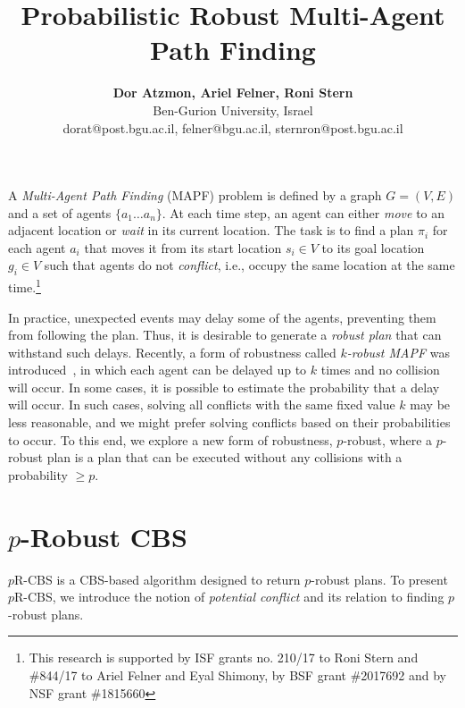 \documentclass[letterpaper]{article} %
\title{Probabilistic Robust Multi-Agent Path Finding}
\author{\Large \textbf{Dor Atzmon, Ariel Felner, Roni Stern}\\ %
Ben-Gurion University, Israel\\ %
dorat@post.bgu.ac.il, felner@bgu.ac.il, sternron@post.bgu.ac.il %
}
\newcommand{\prcbs}{$p$R-CBS\xspace}
\begin{document}
\maketitle


A {\em Multi-Agent Path Finding} (MAPF) problem is defined by a graph $G=(V,E)$ and a set of agents $\{a_1 \dots a_n\}$. At each time step, an agent can either {\em move} to an adjacent location or {\em wait} in its current location. The task is to find a plan $\pi_i$ for each agent $a_i$ that moves it from its start location $s_i \in V$ to its goal location $g_i \in V$ such that agents do not {\em conflict}, i.e., occupy the same location at the same time.\footnote{This research is supported by ISF grants no. 210/17 to Roni Stern and \#844/17 to Ariel Felner and Eyal Shimony, by BSF grant \#2017692 and by NSF grant \#1815660} 

In practice, unexpected events may delay some of the agents, preventing them from following the plan. Thus, it is desirable to generate a {\em robust plan} that can withstand such delays. Recently, a form of robustness called \emph{$k$-robust MAPF} was introduced~\cite{DBLP:conf/socs/AtzmonSFWBZ18}, in which each agent can be delayed up to $k$ times and no collision will occur. 
In some cases, it is possible to estimate the probability that a delay will occur. 
In such cases, solving all conflicts with the same fixed value $k$ may be less reasonable, and we might prefer solving conflicts based on their probabilities to occur. To this end, we explore a new form of robustness, $p$-robust, where a $p$-robust plan is a plan that can be executed without any collisions with a probability $\geq p$. 


\section{$p$-Robust CBS}
 \label{sec:probust-cbs}
 
\prcbs is a CBS-based algorithm \cite{CBSJUR} designed to return $p$-robust plans. To present \prcbs, we introduce the notion of \emph{potential conflict} and its relation to finding $p$-robust plans. 
\end{document}
